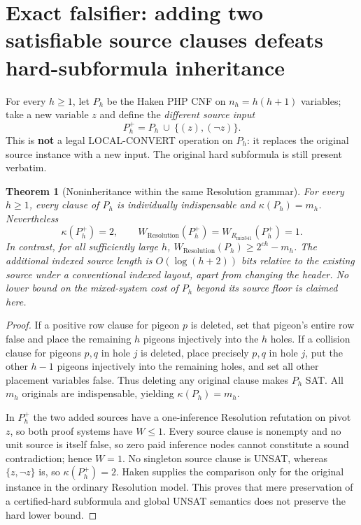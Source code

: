 \documentclass[11pt]{article}
\newtheorem{theorem}{Theorem}
\begin{document}
\section*{Exact falsifier: adding two satisfiable source clauses defeats hard-subformula inheritance}
For every $h\ge1$, let $P_h$ be the Haken PHP CNF on $n_h=h(h+1)$ variables; take a new variable $z$ and define the \emph{different source input}
\[
       P_h^+ = P_h\ \cup\ \{(z),(\neg z)\}.
\]
This is \textbf{not} a legal LOCAL-CONVERT operation on $P_h$: it replaces the original source instance with a new input. The original hard subformula is still present verbatim.

\begin{theorem}[Noninheritance within the same Resolution grammar]
For every $h\ge1$, every clause of $P_h$ is individually indispensable and
$\kappa(P_h)=m_h$. Nevertheless
\[
        \kappa(P_h^+)=2,\qquad
        W_{\mathrm{Resolution}}(P_h^+)
        =W_{R_{\mathrm{mix341}}}(P_h^+)=1.
\]
In contrast, for all sufficiently large $h$,
$W_{\mathrm{Resolution}}(P_h)\ge 2^{ch}-m_h$.
The additional indexed source length is $O(\log(h+2))$ bits relative to the existing source under a conventional indexed layout, apart from changing the header. No lower bound on the mixed-system cost of $P_h$ beyond its source floor is claimed here.
\end{theorem}
\begin{proof}
If a positive row clause for pigeon $p$ is deleted, set that pigeon's entire row false and place the remaining $h$ pigeons injectively into the $h$ holes. If a collision clause for pigeons $p,q$ in hole $j$ is deleted, place precisely $p,q$ in hole $j$, put the other $h-1$ pigeons injectively into the remaining holes, and set all other placement variables false. Thus deleting any original clause makes $P_h$ SAT. All $m_h$ originals are indispensable, yielding $\kappa(P_h)=m_h$.

In $P_h^+$ the two added sources have a one-inference Resolution refutation on pivot $z$, so both proof systems have $W\le1$. Every source clause is nonempty and no unit source is itself false, so zero paid inference nodes cannot constitute a sound contradiction; hence $W=1$. No singleton source clause is UNSAT, whereas $\{z,\neg z\}$ is, so $\kappa(P_h^+)=2$. Haken supplies the comparison only for the original instance in the ordinary Resolution model. This proves that mere preservation of a certified-hard subformula and global UNSAT semantics does not preserve the hard lower bound.
\end{proof}
\end{document}
